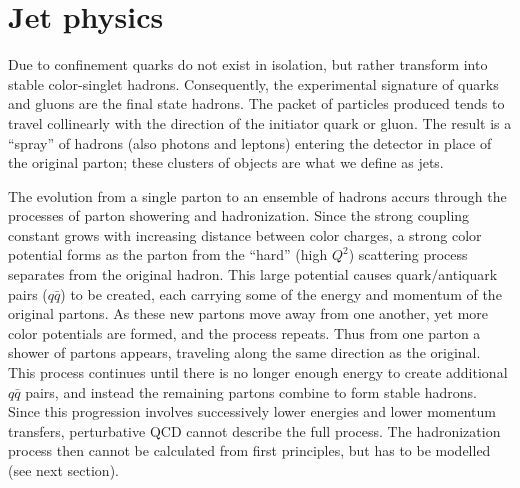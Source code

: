 

\section{Jet physics}\label{sec:jets}


Due to confinement quarks do not exist in isolation, but rather transform into stable color-singlet hadrons. Consequently, the experimental signature of quarks and gluons are the final state hadrons. The packet of particles produced tends to travel collinearly with the direction of the initiator quark or gluon. The result is a ``spray'' of hadrons (also photons and leptons) entering the detector in place of the original parton; these clusters of objects are what we define as jets.

The evolution from a single parton to an ensemble of hadrons accurs through the processes of parton showering and hadronization. Since the strong coupling constant grows with increasing distance between color charges, a strong color potential forms as the parton from the ``hard'' (high $Q^2$) scattering process separates from the original hadron. This large potential causes quark$/$antiquark pairs ($q\bar{q}$) to be created, each carrying some of the energy and momentum of the original partons. As these new partons move away from one another, yet more color potentials are formed, and the process repeats. Thus from one parton a shower of partons appears, traveling along the same direction as the original.  This process continues until there is no longer enough energy to create additional $q\bar{q}$ pairs, and instead the remaining partons combine to form stable hadrons. Since this progression involves successively lower energies and lower momentum transfers, perturbative QCD cannot describe the full process.  The hadronization process then cannot be calculated from first principles, but has to be modelled (see next section). 

